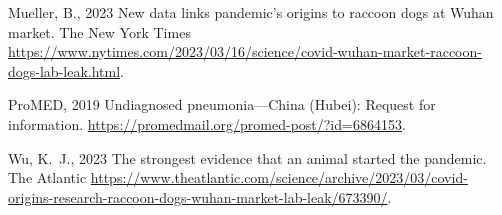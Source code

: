 \documentclass[9pt,onecolumn,twoside]{gsajnl_modified}
\begin{document}
{\begin{thebibliography}{17}
{Mueller, B.}, 2023 New data links pandemic’s origins to raccoon dogs at
  {Wuhan} market. The New York Times
  \url{https://www.nytimes.com/2023/03/16/science/covid-wuhan-market-raccoon-dogs-lab-leak.html}.

{ProMED}, 2019 Undiagnosed pneumonia---{China (Hubei)}: Request for
  information. \url{https://promedmail.org/promed-post/?id=6864153}.

{Wu, K.~J.}, 2023 The strongest evidence that an animal started the pandemic.
  The Atlantic
  \url{https://www.theatlantic.com/science/archive/2023/03/covid-origins-research-raccoon-dogs-wuhan-market-lab-leak/673390/}.

\end{thebibliography}

}

\onecolumn
\renewcommand{\thepage}{S\arabic{page}}
\setcounter{page}{1}
\renewcommand{\thefigure}{S\arabic{figure}}
\setcounter{figure}{0}
\renewcommand{\thetable}{S\arabic{table}}
\setcounter{table}{0}

\clearpage
\end{document}
